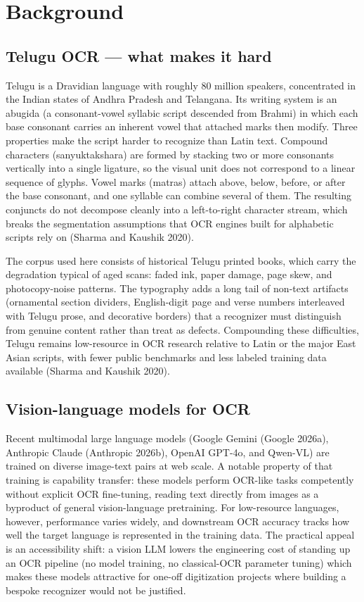 \documentclass[
  letterpaper,
  DIV=11,
  numbers=noendperiod]{scrartcl}
\begin{document}
\section{Background}\label{background}

\subsection{Telugu OCR --- what makes it
hard}\label{telugu-ocr-what-makes-it-hard}

Telugu is a Dravidian language with roughly 80 million speakers,
concentrated in the Indian states of Andhra Pradesh and Telangana. Its
writing system is an abugida (a consonant-vowel syllabic script
descended from Brahmi) in which each base consonant carries an inherent
vowel that attached marks then modify. Three properties make the script
harder to recognize than Latin text. Compound characters
(sanyuktakshara) are formed by stacking two or more consonants
vertically into a single ligature, so the visual unit does not
correspond to a linear sequence of glyphs. Vowel marks (matras) attach
above, below, before, or after the base consonant, and one syllable can
combine several of them. The resulting conjuncts do not decompose
cleanly into a left-to-right character stream, which breaks the
segmentation assumptions that OCR engines built for alphabetic scripts
rely on (Sharma and Kaushik 2020).

The corpus used here consists of historical Telugu printed books, which
carry the degradation typical of aged scans: faded ink, paper damage,
page skew, and photocopy-noise patterns. The typography adds a long tail
of non-text artifacts (ornamental section dividers, English-digit page
and verse numbers interleaved with Telugu prose, and decorative borders)
that a recognizer must distinguish from genuine content rather than
treat as defects. Compounding these difficulties, Telugu remains
low-resource in OCR research relative to Latin or the major East Asian
scripts, with fewer public benchmarks and less labeled training data
available (Sharma and Kaushik 2020).

\subsection{Vision-language models for
OCR}\label{vision-language-models-for-ocr}

Recent multimodal large language models (Google Gemini (Google 2026a),
Anthropic Claude (Anthropic 2026b), OpenAI GPT-4o, and Qwen-VL) are
trained on diverse image-text pairs at web scale. A notable property of
that training is capability transfer: these models perform OCR-like
tasks competently without explicit OCR fine-tuning, reading text
directly from images as a byproduct of general vision-language
pretraining. For low-resource languages, however, performance varies
widely, and downstream OCR accuracy tracks how well the target language
is represented in the training data. The practical appeal is an
accessibility shift: a vision LLM lowers the engineering cost of
standing up an OCR pipeline (no model training, no classical-OCR
parameter tuning) which makes these models attractive for one-off
digitization projects where building a bespoke recognizer would not be
justified.
\end{document}
